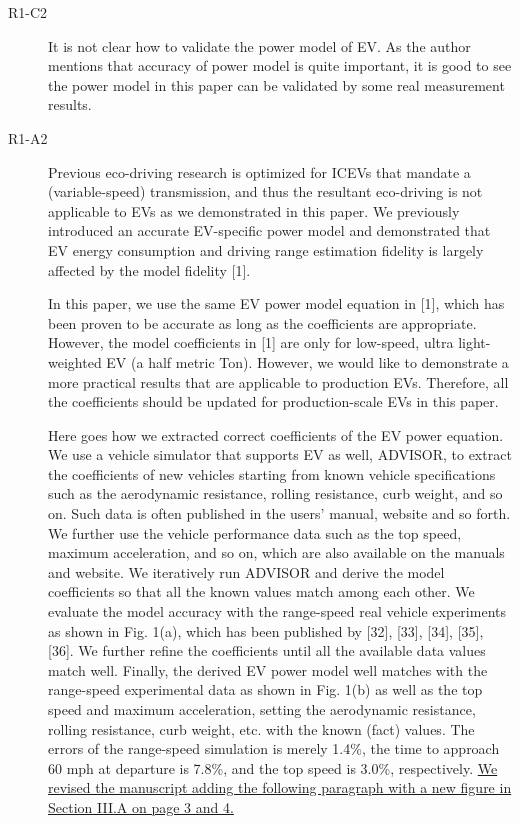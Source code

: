\documentclass[onecolumn]{IEEEconf}
\begin{document}
\begin{description}
\item [R1-C2] It is not clear how to validate the power model of EV. As the author mentions that accuracy of power model is quite important, it is good to see the power model in this paper can be validated by some real measurement results.

\item [R1-A2] Previous eco-driving research is optimized for ICEVs that mandate a (variable-speed) transmission, and thus the resultant eco-driving is not applicable to EVs as we demonstrated in this paper. We previously introduced an accurate EV-specific power model and demonstrated that  EV energy consumption and driving range estimation fidelity is largely affected by the model fidelity [1]. 

In this paper, we use the same EV power model equation in [1], which has been proven to be accurate as long as the coefficients are appropriate. However, the model coefficients in [1] are only for low-speed, ultra light-weighted EV (a half metric Ton). However, we would like to demonstrate a more practical results that are applicable to production EVs. Therefore, all the coefficients should be updated for production-scale EVs in this paper. 

Here goes how we extracted correct coefficients of the EV power equation. We use a vehicle simulator that supports EV as well, ADVISOR, to extract the coefficients of new vehicles starting from known vehicle specifications such as the aerodynamic resistance, rolling resistance, curb weight, and so on. Such data is often published in the users' manual, website and so forth. We further use the vehicle performance data such as the top speed, maximum acceleration, and so on, which are also available on the manuals and website. We iteratively run ADVISOR and derive the model coefficients so that all the known values match among each other. We evaluate the model accuracy with the range-speed real vehicle experiments as shown in Fig. 1(a), which has been published by [32], [33], [34], [35], [36]. We further refine the coefficients until all the available data values match well. Finally, the derived EV power model well matches with the range-speed experimental data as shown in Fig. 1(b) as well as the top speed and maximum acceleration, setting the aerodynamic resistance, rolling resistance, curb weight, etc. with the known (fact) values. The errors of the range-speed simulation is merely 1.4\%, the time to approach 60 mph at departure is 7.8\%, and the top speed is 3.0\%, respectively. \uline{We revised the manuscript adding the following paragraph with a new figure in Section III.A on page 3 and 4.} \\


\end{description}
\end{document}
